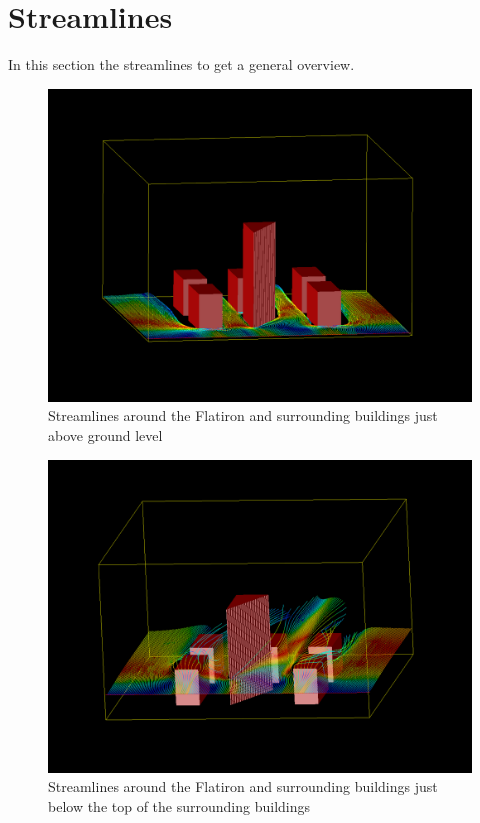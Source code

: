 \section{Streamlines}
\label{sec:streamlines}
In this section the streamlines to get a general overview. \\
\begin{figure}[hp]
\centering
\includegraphics[width =  \textwidth]{streamlinesbottom.png}
\caption{Streamlines around the Flatiron and surrounding buildings just above ground level}
\label{fig:streamlinesbottom}
\end{figure}
\begin{figure}[hp]
\centering
\includegraphics[width = \textwidth]{streamlinesmid.png}
\caption{Streamlines around the Flatiron and surrounding buildings just below the top of the surrounding buildings}
\label{fig:streamlinesmid}
\end{figure}
